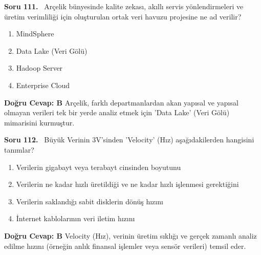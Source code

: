 \documentclass[11pt,a4paper,openany]{book}
\begin{document}
\needspace{5cm}
\vspace{8pt}
\noindent\textbf{\large\sffamily Soru 111.} \ Arçelik bünyesinde kalite zekası, akıllı servis yönlendirmeleri ve üretim verimliliği için oluşturulan ortak veri havuzu projesine ne ad verilir?
\begin{enumerate}[label=\Alph*), leftmargin=25pt, topsep=4pt, itemsep=2pt]
    \item MindSphere
    \item Data Lake (Veri Gölü)
    \item Hadoop Server
    \item Enterprise Cloud
\end{enumerate}
\vspace{4pt}
\begin{tcolorbox}[title=Cevap ve Açıklama, colback=gray!3!white, colframe=primarycolor!90!black, arc=2mm, fonttitle=\bfseries\sffamily, top=6pt, bottom=6pt]
    \textbf{Doğru Cevap: B}
    \vspace{2pt}
    Arçelik, farklı departmanlardan akan yapısal ve yapısal olmayan verileri tek bir yerde analiz etmek için 'Data Lake' (Veri Gölü) mimarisini kurmuştur.
\end{tcolorbox}
\vspace{10pt}

\needspace{5cm}
\vspace{8pt}
\noindent\textbf{\large\sffamily Soru 112.} \ Büyük Verinin 3V'sinden 'Velocity' (Hız) aşağıdakilerden hangisini tanımlar?
\begin{enumerate}[label=\Alph*), leftmargin=25pt, topsep=4pt, itemsep=2pt]
    \item Verilerin gigabayt veya terabayt cinsinden boyutunu
    \item Verilerin ne kadar hızlı üretildiği ve ne kadar hızlı işlenmesi gerektiğini
    \item Verilerin saklandığı sabit disklerin dönüş hızını
    \item İnternet kablolarının veri iletim hızını
\end{enumerate}
\vspace{4pt}
\begin{tcolorbox}[title=Cevap ve Açıklama, colback=gray!3!white, colframe=primarycolor!90!black, arc=2mm, fonttitle=\bfseries\sffamily, top=6pt, bottom=6pt]
    \textbf{Doğru Cevap: B}
    \vspace{2pt}
    Velocity (Hız), verinin üretim sıklığı ve gerçek zamanlı analiz edilme hızını (örneğin anlık finansal işlemler veya sensör verileri) temsil eder.
\end{tcolorbox}
\vspace{10pt}
\end{document}
